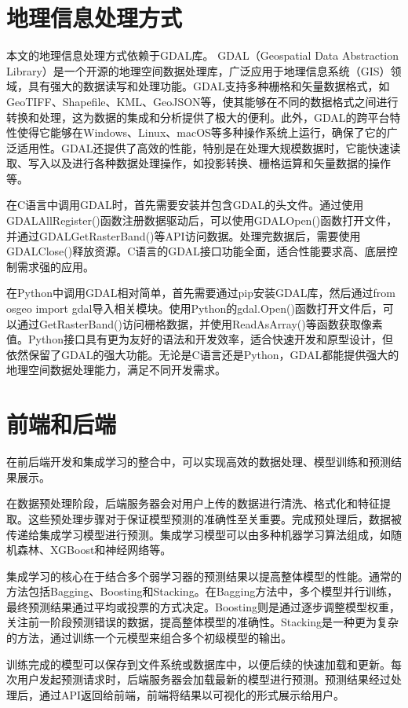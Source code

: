 \documentclass[AutoFakeBold]{LZUThesis-PgD&PhD}
\begin{document}
\section{地理信息处理方式}

本文的地理信息处理方式依赖于GDAL库。
GDAL（Geospatial Data Abstraction Library）是一个开源的地理空间数据处理库，广泛应用于地理信息系统（GIS）领域，具有强大的数据读写和处理功能。GDAL支持多种栅格和矢量数据格式，如GeoTIFF、Shapefile、KML、GeoJSON等，使其能够在不同的数据格式之间进行转换和处理，这为数据的集成和分析提供了极大的便利。此外，GDAL的跨平台特性使得它能够在Windows、Linux、macOS等多种操作系统上运行，确保了它的广泛适用性。GDAL还提供了高效的性能，特别是在处理大规模数据时，它能快速读取、写入以及进行各种数据处理操作，如投影转换、栅格运算和矢量数据的操作等。

在C语言中调用GDAL时，首先需要安装并包含GDAL的头文件。通过使用GDALAllRegister()函数注册数据驱动后，可以使用GDALOpen()函数打开文件，并通过GDALGetRasterBand()等API访问数据。处理完数据后，需要使用GDALClose()释放资源。C语言的GDAL接口功能全面，适合性能要求高、底层控制需求强的应用。

在Python中调用GDAL相对简单，首先需要通过pip安装GDAL库，然后通过from osgeo import gdal导入相关模块。使用Python的gdal.Open()函数打开文件后，可以通过GetRasterBand()访问栅格数据，并使用ReadAsArray()等函数获取像素值。Python接口具有更为友好的语法和开发效率，适合快速开发和原型设计，但依然保留了GDAL的强大功能。无论是C语言还是Python，GDAL都能提供强大的地理空间数据处理能力，满足不同开发需求。


\section{前端和后端}
在前后端开发和集成学习的整合中，可以实现高效的数据处理、模型训练和预测结果展示。

在数据预处理阶段，后端服务器会对用户上传的数据进行清洗、格式化和特征提取。这些预处理步骤对于保证模型预测的准确性至关重要。完成预处理后，数据被传递给集成学习模型进行预测。集成学习模型可以由多种机器学习算法组成，如随机森林、XGBoost和神经网络等。

集成学习的核心在于结合多个弱学习器的预测结果以提高整体模型的性能。通常的方法包括Bagging、Boosting和Stacking。在Bagging方法中，多个模型并行训练，最终预测结果通过平均或投票的方式决定。Boosting则是通过逐步调整模型权重，关注前一阶段预测错误的数据，提高整体模型的准确性。Stacking是一种更为复杂的方法，通过训练一个元模型来组合多个初级模型的输出。

训练完成的模型可以保存到文件系统或数据库中，以便后续的快速加载和更新。每次用户发起预测请求时，后端服务器会加载最新的模型进行预测。预测结果经过处理后，通过API返回给前端，前端将结果以可视化的形式展示给用户。
\end{document}
